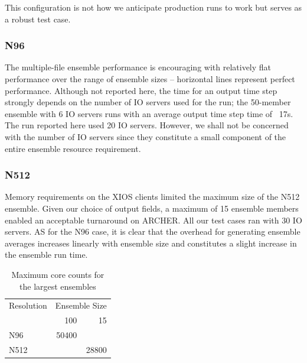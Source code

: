 \documentclass[twocolumn, 5p, times]{elsarticle}
\begin{document}
 This configuration is not how we anticipate production runs to work but serves as a robust test case.

\subsubsection{N96}

The multiple-file ensemble performance is encouraging with relatively flat performance over the range of ensemble sizes -- horizontal lines represent perfect performance. Although not reported here, the time for an output time step strongly depends on the number of IO servers used for the run; the 50-member ensemble with 6 IO servers runs with an average output time step time of ~17s. The run reported here used 20 IO servers. However, we shall not be concerned with the number of IO servers since they constitute a small component of the entire ensemble resource requirement. 



\subsubsection{N512}

Memory requirements on the XIOS clients limited the maximum size of the N512 ensemble. Given our choice of output fields, a maximum of 15 ensemble members enabled an acceptable turnaround on ARCHER. All our test cases ran with 30 IO servers. AS for the N96 case, it is clear that the overhead for generating ensemble averages increases linearly with ensemble size and constitutes a slight increase in the ensemble run time.



\begin{table}
	\begin{center}
	\begin{tabular}{|l|r|r|}
		\hline
		Resolution & \multicolumn{2}{c|}{Ensemble Size} \\
		 & 100 & 15 \\ \hline
		N96 & 50400 & \\
		N512 & & 28800 \\
		\hline
	\end{tabular}
	\caption{Maximum core counts for the largest ensembles}
        \label{table2}
	\end{center}
\end{table}
\end{document}

